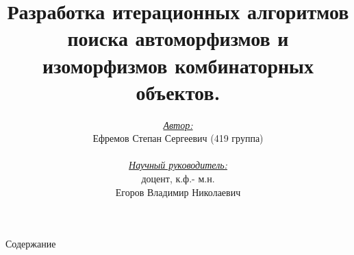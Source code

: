 \documentclass{beamer}
\begin{document}
\title{Разработка итерационных алгоритмов поиска автоморфизмов
и изоморфизмов комбинаторных объектов.}


\author{\textit{\underline{Автор:}}\\ Ефремов Степан Сергеевич (419 группа)\\ \\
\textit{\underline {Научный руководитель:}}\\ доцент, к.ф.- м.н.\\ Егоров Владимир Николаевич}



\begin{frame}{}
\titlepage
\end{frame}


\begin{frame}{Содержание}
\tableofcontents
\end{frame} 
\end{document}
